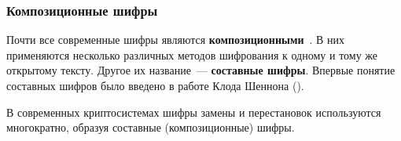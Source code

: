 \subsubsection{Композиционные шифры}

Почти все современные шифры являются \textbf{композиционными}~\cite{AlZKCh:2001}. В них применяются несколько различных методов шифрования к одному и тому же открытому тексту. Другое их название~--- \textbf{составные шифры}. Впервые понятие составных шифров было введено в работе Клода Шеннона ().

В современных криптосистемах шифры замены и перестановок используются многократно, образуя составные (композиционные) шифры.

